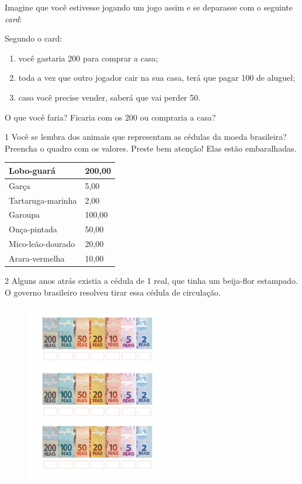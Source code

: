 {Imagine que você estivesse jogando um jogo assim e se deparasse com o seguinte
\emph{card}:

Segundo o card:

\begin{enumerate}
\item você gastaria 200 para comprar a casa;

\item toda a vez que outro jogador cair na sua casa, terá que pagar 100 de aluguel;

\item caso você precise vender, saberá que vai perder 50.
\end{enumerate}

O que você faria? Ficaria com os 200 ou compraria a casa?
}



\num{1} Você se lembra dos animais que representam as cédulas da moeda
brasileira? Preencha o quadro com os valores. Preste bem atenção!
Elas estão embaralhadas.

\begin{longtable}[]{@{}ll@{}}
\toprule
Lobo-guará & 200,00\tabularnewline
\midrule
\endhead
Garça & 5,00\tabularnewline
Tartaruga-marinha & 2,00\tabularnewline
Garoupa & 100,00\tabularnewline
Onça-pintada & 50,00\tabularnewline
Mico-leão-dourado & 20,00\tabularnewline
Arara-vermelha & 10,00\tabularnewline
\bottomrule
\end{longtable}


\num{2} Alguns anos atrás existia a cédula de 1 real, que tinha um beija-flor
estampado. O governo brasileiro resolveu tirar essa cédula de circulação.


\includegraphics[width=3.30208in,height=3.08528in]{media/image70.png}

